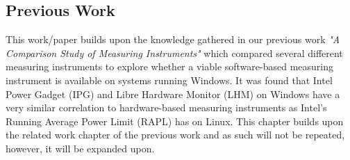 \subsection{Previous Work}
This work/paper builds upon the knowledge gathered in our previous work \textit{"A Comparison Study of Measuring Instruments"}\cite{biksbois} which compared several different measuring instruments to explore whether a viable software-based measuring instrument is available on systems running Windows. It was found that Intel Power Gadget (IPG) and Libre Hardware Monitor (LHM) on Windows have a very similar correlation to hardware-based measuring instruments as Intel's Running Average Power Limit (RAPL) has on Linux. This chapter builds upon the related work chapter of the previous work and as such will not be repeated, however, it will be expanded upon.
